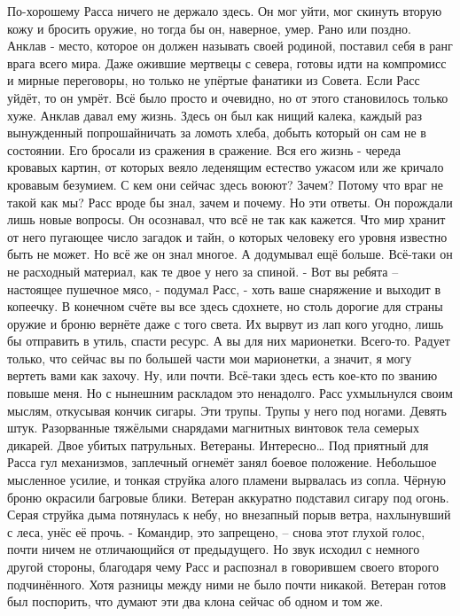 \documentclass[a4paper, 12pt]{report}
\begin{document}
	По-хорошему Расса ничего не держало здесь. Он мог уйти, мог скинуть вторую кожу и бросить оружие, но тогда бы он, наверное, умер. Рано или поздно. Анклав - место, которое он должен называть своей родиной, поставил себя в ранг врага всего мира. Даже ожившие мертвецы с севера, готовы идти на компромисс и  мирные переговоры, но только не упёртые фанатики из Совета. Если Расс уйдёт, то он умрёт. Всё было просто и очевидно, но от этого становилось только хуже. Анклав давал ему жизнь. Здесь он был как нищий калека, каждый раз вынужденный попрошайничать за ломоть хлеба, добыть который он сам не в состоянии. Его бросали из сражения в сражение. Вся его жизнь - череда кровавых картин, от которых веяло леденящим естество ужасом или же кричало кровавым безумием. 
	С кем они сейчас здесь воюют? Зачем? Потому что враг не такой как мы? Расс вроде бы знал, зачем и почему. Но эти ответы. Он порождали лишь новые вопросы. Он осознавал, что всё не так как кажется. Что мир хранит от него пугающее число загадок и тайн, о которых человеку его уровня известно быть не может. Но всё же он знал многое. А додумывал ещё больше. Всё-таки он не расходный материал, как те двое у него за спиной.
	- Вот вы ребята – настоящее пушечное мясо, - подумал Расс, - хоть ваше снаряжение и выходит в копеечку. В конечном счёте вы все здесь сдохнете, но столь дорогие для страны оружие и броню вернёте даже с того света. Их вырвут из лап кого угодно, лишь бы отправить в утиль, спасти ресурс. А вы для них марионетки. Всего-то. Радует только, что сейчас вы по большей части мои марионетки, а значит, я могу вертеть вами как захочу. Ну, или почти. Всё-таки здесь есть кое-кто по званию повыше меня. Но с нынешним раскладом это ненадолго. 
	Расс ухмыльнулся своим мыслям, откусывая кончик сигары. Эти трупы. Трупы у него под ногами. Девять штук. Разорванные тяжёлыми снарядами магнитных винтовок тела семерых дикарей. Двое убитых патрульных. Ветераны. Интересно… 
Под приятный для Расса гул механизмов, заплечный огнемёт занял боевое положение. Небольшое мысленное усилие, и тонкая струйка алого пламени вырвалась из сопла. Чёрную броню окрасили багровые блики. Ветеран аккуратно подставил сигару под огонь. Серая струйка дыма потянулась к небу, но внезапный порыв ветра, нахлынувший с леса, унёс её прочь.
	- Командир, это запрещено, – снова этот глухой голос, почти ничем не отличающийся от предыдущего. Но звук исходил с немного другой стороны, благодаря чему Расс и распознал в говорившем своего второго подчинённого. Хотя разницы между ними не было почти никакой. Ветеран готов был поспорить, что думают эти два клона сейчас об одном и том же.
\end{document}
